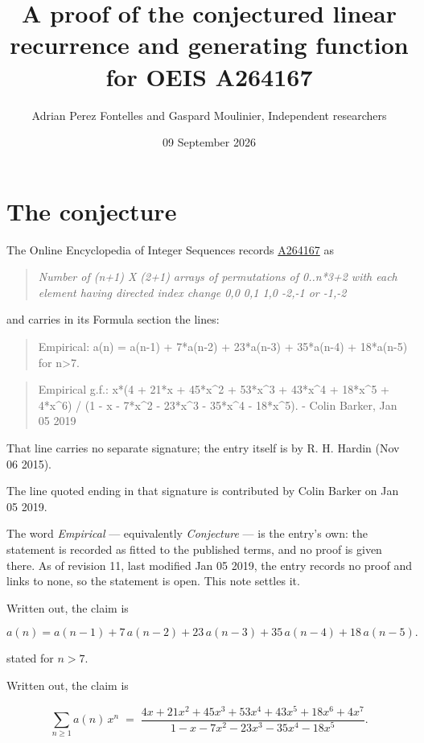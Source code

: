 \documentclass[11pt]{article}
\title{A proof of the conjectured linear recurrence and generating function for OEIS A264167}
\author{Adrian Perez Fontelles and Gaspard Moulinier, Independent researchers}
\date{09 September 2026}
\theoremstyle{definition}
\begin{document}
\maketitle
\section{The conjecture}

The Online Encyclopedia of Integer Sequences records \href{https://oeis.org/A264167}{A264167} as

\begin{quote}\itshape Number of (n+1) X (2+1) arrays of permutations of 0..n*3+2 with each element having directed index change 0,0 0,1 1,0 -2,-1 or -1,-2\end{quote}

and carries in its Formula section the lines:

\begin{quote}\ttfamily Empirical: a(n) = a(n-1) + 7*a(n-2) + 23*a(n-3) + 35*a(n-4) + 18*a(n-5) for n>7.\end{quote}

\begin{quote}\ttfamily Empirical g.f.: x*(4 + 21*x + 45*x\textasciicircum{}2 + 53*x\textasciicircum{}3 + 43*x\textasciicircum{}4 + 18*x\textasciicircum{}5 + 4*x\textasciicircum{}6) / (1 - x - 7*x\textasciicircum{}2 - 23*x\textasciicircum{}3 - 35*x\textasciicircum{}4 - 18*x\textasciicircum{}5). - Colin Barker, Jan 05 2019\end{quote}

That line carries no separate signature; the entry itself is by R. H. Hardin (Nov 06 2015).

The line quoted ending in that signature is contributed by Colin Barker on Jan 05 2019.

The word {\itshape Empirical} --- equivalently {\itshape Conjecture} --- is the entry's own: the statement is recorded as fitted to the published terms, and no proof is given there. As of revision 11, last modified Jan 05 2019, the entry records no proof and links to none, so the statement is open. This note settles it.

Written out, the claim is

\[a(n) = a(n-1) + 7\,a(n-2) + 23\,a(n-3) + 35\,a(n-4) + 18\,a(n-5).\]

stated for $n > 7$.

Written out, the claim is

\[\sum_{n \ge 1} a(n)\,x^n \;=\; \frac{4x + 21x^{2} + 45x^{3} + 53x^{4} + 43x^{5} + 18x^{6} + 4x^{7}}{1 - x - 7x^{2} - 23x^{3} - 35x^{4} - 18x^{5}}.\]
\end{document}
